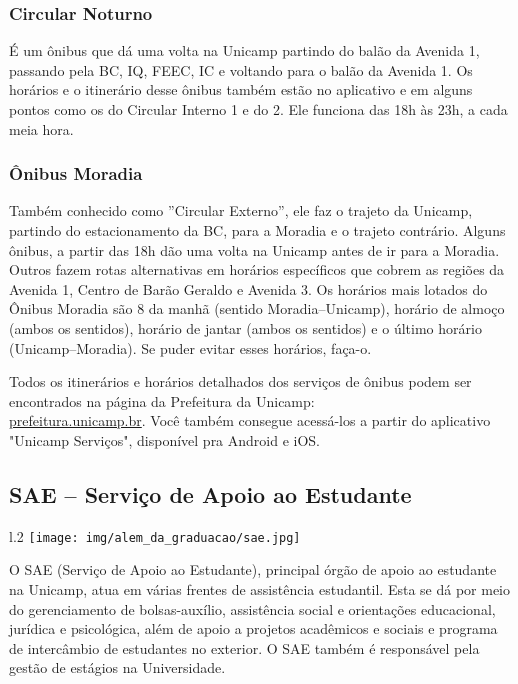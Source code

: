 \subsubsection{Circular Noturno}
É um ônibus que dá uma volta na Unicamp partindo do balão da Avenida 1, passando
pela BC, IQ, FEEC, IC e voltando para o balão da Avenida 1.  Os horários e o
itinerário desse ônibus também estão no aplicativo e em alguns pontos como os do
Circular Interno 1 e do 2. Ele funciona das 18h às 23h, a cada meia hora.

\subsubsection{Ônibus Moradia}
Também conhecido como ''Circular Externo'', ele faz o trajeto da Unicamp,
partindo do estacionamento da BC, para a Moradia e o trajeto contrário.  Alguns
ônibus, a partir das 18h dão uma volta na Unicamp antes de ir para a
Moradia. Outros fazem rotas alternativas em horários específicos que cobrem as
regiões da Avenida 1, Centro de Barão Geraldo e Avenida 3. Os horários mais
lotados do Ônibus Moradia são 8 da manhã (sentido Moradia--Unicamp), horário de
almoço (ambos os sentidos), horário de jantar (ambos os sentidos) e o último
horário (Unicamp--Moradia). Se puder evitar esses horários, faça-o.

Todos os itinerários e horários detalhados dos serviços de ônibus podem ser
encontrados na página da Prefeitura da Unicamp: \\\url{prefeitura.unicamp.br}.
Você também consegue acessá-los a partir do aplicativo "Unicamp Serviços",
disponível pra Android e iOS.

\subsection{SAE -- Serviço de Apoio ao Estudante}
\begin{wrapfigure}{l}{.2\textwidth}
    \centering
    \texttt{[image: img/alem\_da\_graduacao/sae.jpg]}
\end{wrapfigure}
O SAE (Serviço de Apoio ao Estudante), principal órgão de apoio ao estudante na
Unicamp, atua em várias frentes de assistência estudantil. Esta se dá por meio do
gerenciamento de bolsas-auxílio, assistência social e orientações educacional,
jurídica e psicológica, além de apoio a projetos acadêmicos e sociais e programa
de intercâmbio de estudantes no exterior. O SAE também é responsável pela gestão
de estágios na Universidade.

